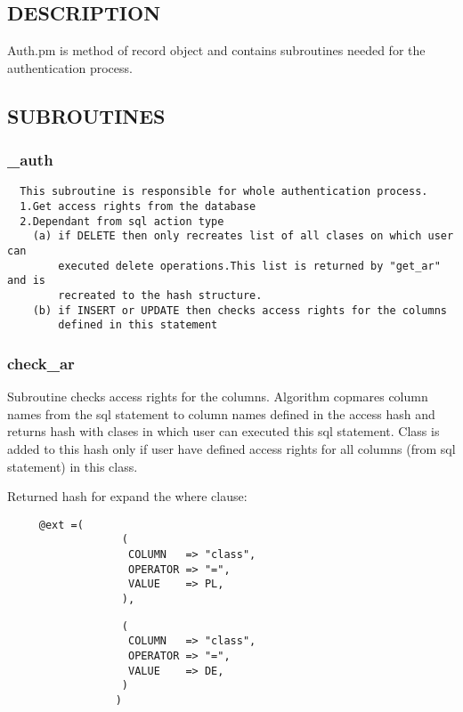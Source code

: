 \subsection{DESCRIPTION\label{DESCRIPTION}}


Auth.pm is method of record object and contains subroutines needed for the authentication process.

\subsection{SUBROUTINES\label{SUBROUTINES}}
\subsubsection*{\_auth\label{_auth}}
\begin{verbatim}
  This subroutine is responsible for whole authentication process.
  1.Get access rights from the database
  2.Dependant from sql action type
    (a) if DELETE then only recreates list of all clases on which user can 
        executed delete operations.This list is returned by "get_ar" and is 
        recreated to the hash structure.
    (b) if INSERT or UPDATE then checks access rights for the columns 
        defined in this statement
\end{verbatim}
\subsubsection*{check\_ar\label{check_ar}}


Subroutine checks access rights for the columns.
Algorithm copmares column names from the sql statement to column names defined 
in the access hash and returns hash with clases in which user can executed this 
sql statement. Class is added to this hash only if user have defined access rights 
for all columns (from sql statement) in this class.



Returned hash for expand the where clause:

\begin{verbatim}
     @ext =(
                  (
                   COLUMN   => "class",
                   OPERATOR => "=",
                   VALUE    => PL,
                  ),
\end{verbatim}
\begin{verbatim}
                  (
                   COLUMN   => "class",
                   OPERATOR => "=",
                   VALUE    => DE,
                  )
                 )
\end{verbatim}
